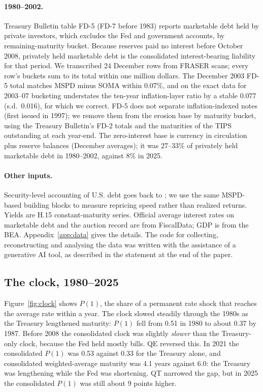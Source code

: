 \paragraph{1980--2002.} Treasury Bulletin table FD-5 (FD-7 before 1983) reports marketable debt held by private investors, which excludes the Fed and government accounts, by remaining-maturity bucket. Because reserves paid no interest before October 2008, privately held marketable debt is the consolidated interest-bearing liability for that period. We transcribed 24 December rows from FRASER scans; every row's buckets sum to its total within one million dollars. The December 2003 FD-5 total matches MSPD minus SOMA within 0.07\%, and on the exact data for 2003--07 bucketing understates the ten-year inflation-layer ratio by a stable 0.077 (s.d.\ 0.016), for which we correct. FD-5 does not separate inflation-indexed notes (first issued in 1997); we remove them from the erosion base by maturity bucket, using the Treasury Bulletin's FD-2 totals and the maturities of the TIPS outstanding at each year-end. The zero-interest base is currency in circulation plus reserve balances (December averages); it was 27--33\% of privately held marketable debt in 1980--2002, against 8\% in 2025.

\paragraph{Other inputs.} Security-level accounting of U.S. debt goes back to \citet{hall2011}; we use the same MSPD-based building blocks to measure repricing speed rather than realized returns. Yields are H.15 constant-maturity series. Official average interest rates on marketable debt and the auction record are from FiscalData; GDP is from the BEA. Appendix~\ref{app:data} gives the details. The code for collecting, reconstructing and analysing the data was written with the assistance of a generative AI tool, as described in the statement at the end of the paper.

\subsection{The clock, 1980--2025}\label{sec:clock}

Figure~\ref{fig:clock} shows $P(1)$, the share of a permanent rate shock that reaches the average rate within a year. The clock slowed steadily through the 1980s as the Treasury lengthened maturity: $P(1)$ fell from 0.51 in 1980 to about 0.37 by 1987. Before 2008 the consolidated clock was slightly \emph{slower} than the Treasury-only clock, because the Fed held mostly bills. QE reversed this. In 2021 the consolidated $P(1)$ was 0.53 against 0.33 for the Treasury alone, and consolidated weighted-average maturity was 4.1 years against 6.0: the Treasury was lengthening while the Fed was shortening. QT narrowed the gap, but in 2025 the consolidated $P(1)$ was still about 9 points higher.

